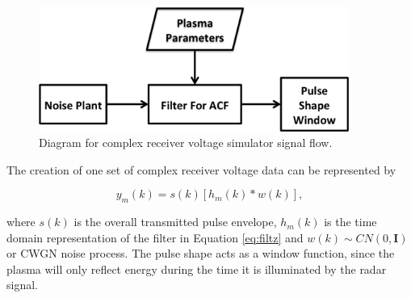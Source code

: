 \documentclass[draft,ras]{agutex}
\begin{document}
\begin{article}
\begin{figure}[h!]
\centering
\includegraphics[width=4in]{diagrampart}
\caption{Diagram for complex receiver voltage simulator signal flow.}
\label{fig:IQdiagram}
\end{figure}

The creation of one set of complex receiver voltage data can be represented by

\begin{equation}
\label{eq2}
y_m (k)= s(k)\left[h_m(k)*w(k)\right],
\end{equation}
 
\noindent where $s(k)$ is the overall transmitted pulse envelope, $h_m(k)$ is the time domain representation of the filter in Equation \ref{eq:filtz} and $w(k)\sim CN(0,\mathbf{I})$ or CWGN noise process. The pulse shape acts as a window function, since the plasma will only reflect energy during the time it is illuminated by the radar signal. 

%


\end{article}
\end{document}
